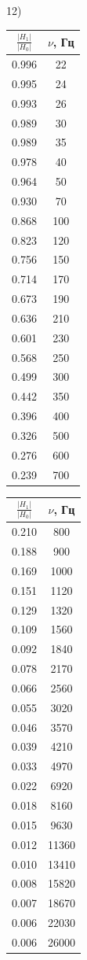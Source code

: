 \documentclass[a4paper,12pt]{extarticle}
\begin{document}
12) 
\begin{tabular}{|c|c|}
\hline
$\frac{|H_1|}{|H_0|}$     & $\nu$, Гц  \\ \hline
0.996 & 22  \\ \hline
0.995 & 24  \\ \hline
0.993 & 26  \\ \hline
0.989 & 30  \\ \hline
0.989 & 35  \\ \hline
0.978 & 40  \\ \hline
0.964 & 50  \\ \hline
0.930 & 70  \\ \hline
0.868 & 100 \\ \hline
0.823 & 120 \\ \hline
0.756 & 150 \\ \hline
0.714 & 170 \\ \hline
0.673 & 190 \\ \hline
0.636 & 210 \\ \hline
0.601 & 230 \\ \hline
0.568 & 250 \\ \hline
0.499 & 300 \\ \hline
0.442 & 350 \\ \hline
0.396 & 400 \\ \hline
0.326 & 500 \\ \hline
0.276 & 600 \\ \hline
0.239 & 700 \\ \hline
\end{tabular}
\begin{tabular}{|c|c|}
\hline
$\frac{|H_1|}{|H_0|}$     & $\nu$, Гц  \\ \hline
0.210 & 800   \\ \hline
0.188 & 900   \\ \hline
0.169 & 1000  \\ \hline
0.151 & 1120  \\ \hline
0.129 & 1320  \\ \hline
0.109 & 1560  \\ \hline
0.092 & 1840  \\ \hline
0.078 & 2170  \\ \hline
0.066 & 2560  \\ \hline
0.055 & 3020  \\ \hline
0.046 & 3570  \\ \hline
0.039 & 4210  \\ \hline
0.033 & 4970  \\ \hline
0.022 & 6920  \\ \hline
0.018 & 8160  \\ \hline
0.015 & 9630  \\ \hline
0.012 & 11360 \\ \hline
0.010 & 13410 \\ \hline
0.008 & 15820 \\ \hline
0.007 & 18670 \\ \hline
0.006 & 22030 \\ \hline
0.006 & 26000 \\ \hline
\end{tabular}
\end{document}

